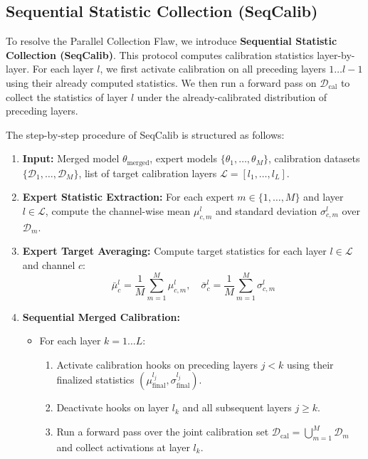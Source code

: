 \documentclass{article}
\theoremstyle{plain}
\theoremstyle{definition}
\theoremstyle{remark}
\begin{document}
\subsection{Sequential Statistic Collection (SeqCalib)}
To resolve the Parallel Collection Flaw, we introduce \textbf{Sequential Statistic Collection (SeqCalib)}. This protocol computes calibration statistics layer-by-layer. For each layer $l$, we first activate calibration on all preceding layers $1 \dots l-1$ using their already computed statistics. We then run a forward pass on $\mathcal{D}_{\text{cal}}$ to collect the statistics of layer $l$ under the already-calibrated distribution of preceding layers. 

The step-by-step procedure of SeqCalib is structured as follows:
\begin{enumerate}
    \item \textbf{Input:} Merged model $\theta_{\text{merged}}$, expert models $\{\theta_1, \dots, \theta_M\}$, calibration datasets $\{\mathcal{D}_1, \dots, \mathcal{D}_M\}$, list of target calibration layers $\mathcal{L} = [l_1, \dots, l_L]$.
    \item \textbf{Expert Statistic Extraction:} For each expert $m \in \{1, \dots, M\}$ and layer $l \in \mathcal{L}$, compute the channel-wise mean $\mu^l_{c, m}$ and standard deviation $\sigma^l_{c, m}$ over $\mathcal{D}_m$.
    \item \textbf{Expert Target Averaging:} Compute target statistics for each layer $l \in \mathcal{L}$ and channel $c$:
    \begin{equation}
    \bar{\mu}^l_c = \frac{1}{M} \sum_{m=1}^M \mu^l_{c, m}, \quad \bar{\sigma}^l_c = \frac{1}{M} \sum_{m=1}^M \sigma^l_{c, m}
    \end{equation}
    \item \textbf{Sequential Merged Calibration:}
    \begin{itemize}
        \item For each layer $k = 1 \dots L$:
        \begin{enumerate}
            \item Activate calibration hooks on preceding layers $j < k$ using their finalized statistics $(\mu^{l_j}_{\text{final}}, \sigma^{l_j}_{\text{final}})$.
            \item Deactivate hooks on layer $l_k$ and all subsequent layers $j \ge k$.
            \item Run a forward pass over the joint calibration set $\mathcal{D}_{\text{cal}} = \bigcup_{m=1}^M \mathcal{D}_m$ and collect activations at layer $l_k$.

\end{enumerate}
\end{itemize}
\end{enumerate}
\end{document}
